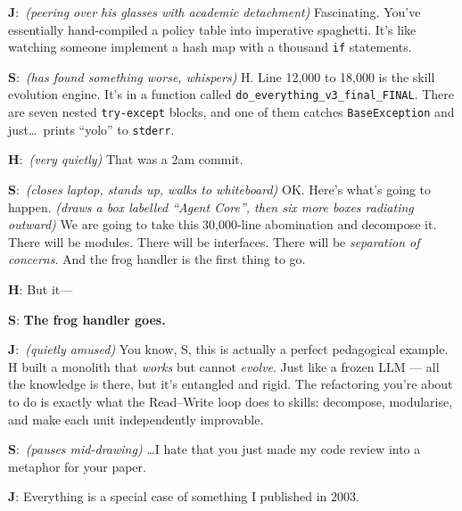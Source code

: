 \documentclass[11pt,a4paper]{article}
\newcommand{\J}[0]{{\sffamily\bfseries\color{marginJ}J}}
\newcommand{\Hstudent}[0]{{\sffamily\bfseries\color{marginH}H}}
\newcommand{\Senior}[0]{{\sffamily\bfseries\color{marginS}S}}
\newcommand{\stage}[1]{{\small\itshape\color{black!50}(#1)}}
\begin{document}
\begin{dialogue}
\vspace{4pt}
\J:~\stage{peering over his glasses with academic detachment} Fascinating. You've essentially hand-compiled a policy table into imperative spaghetti. It's like watching someone implement a hash map with a thousand \texttt{if} statements.

\vspace{4pt}
\Senior:~\stage{has found something worse, whispers} H. Line 12,000 to 18,000 is the skill evolution engine. It's in a function called \texttt{do\_everything\_v3\_final\_FINAL}. There are seven nested \texttt{try-except} blocks, and one of them catches \texttt{BaseException} and just\ldots\ prints ``yolo'' to \texttt{stderr}.

\vspace{4pt}
\Hstudent:~\stage{very quietly} That was a 2am commit.

\vspace{4pt}
\Senior:~\stage{closes laptop, stands up, walks to whiteboard} OK. Here's what's going to happen. \stage{draws a box labelled ``Agent Core'', then six more boxes radiating outward} We are going to take this 30{,}000-line abomination and decompose it. There will be modules. There will be interfaces. There will be \textit{separation of concerns}. And the frog handler is the first thing to go.

\vspace{4pt}
\Hstudent: But it---

\vspace{4pt}
\Senior: \textbf{The frog handler goes.}

\vspace{4pt}
\J:~\stage{quietly amused} You know, S, this is actually a perfect pedagogical example. H built a monolith that \textit{works} but cannot \textit{evolve}. Just like a frozen LLM --- all the knowledge is there, but it's entangled and rigid. The refactoring you're about to do is exactly what the Read--Write loop does to skills: decompose, modularise, and make each unit independently improvable.

\vspace{4pt}
\Senior:~\stage{pauses mid-drawing} \ldots I hate that you just made my code review into a metaphor for your paper.

\vspace{4pt}
\J: Everything is a special case of something I published in 2003.

\end{dialogue}
\end{document}
